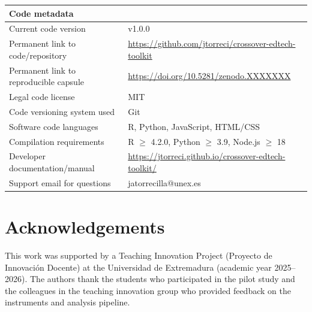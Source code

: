 \documentclass[authoryear,preprint,review,12pt]{elsarticle}
\begin{document}
\begin{table}[htbp]
\centering
\begin{tabular}{ll}
\toprule
\textbf{Code metadata} & \\
\midrule
Current code version & v1.0.0 \\
Permanent link to code/repository & \url{https://github.com/jtorreci/crossover-edtech-toolkit} \\
Permanent link to reproducible capsule & \url{https://doi.org/10.5281/zenodo.XXXXXXX} \\
Legal code license & MIT \\
Code versioning system used & Git \\
Software code languages & R, Python, JavaScript, HTML/CSS \\
Compilation requirements & R $\geq$ 4.2.0, Python $\geq$ 3.9, Node.js $\geq$ 18 \\
Developer documentation/manual & \url{https://jtorreci.github.io/crossover-edtech-toolkit/} \\
Support email for questions & jatorrecilla@unex.es \\
\bottomrule
\end{tabular}
\end{table}

\section*{Acknowledgements}

This work was supported by a Teaching Innovation Project (Proyecto de
Innovaci\'on Docente) at the Universidad de Extremadura (academic year
2025--2026). The authors thank the students who participated in the
pilot study and the colleagues in the teaching innovation group who
provided feedback on the instruments and analysis pipeline.



\end{document}
